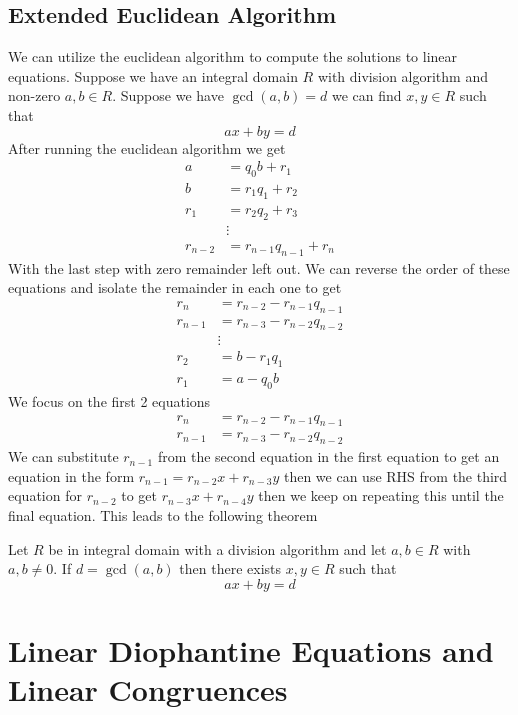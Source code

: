 \documentclass[16pt,a4paper]{article}
\theoremstyle{definition}
\begin{document}
\subsection{Extended Euclidean Algorithm}
We can utilize the euclidean algorithm to compute the solutions to linear equations. Suppose we have an integral domain $R$ with division algorithm and non-zero $a,b\in R$. Suppose we have $\gcd(a,b) = d$ we can find $x,y\in R$ such that 
\[ax+by=d\]
After running the euclidean algorithm we get  
\begin{align*}
a&=q_0b+r_1 \\
b &= r_1q_1 + r_2 \\
r_1 &= r_2q_2+r_3 \\
&\vdots \\
r_{n-2} &= r_{n-1}q_{n-1} + r_{n} 
\end{align*}
With the last step with zero remainder left out. 
\newpage
We can reverse the order of these equations and isolate the remainder in each one to get
\begin{align*}
r_n &= r_{n-2}-r_{n-1}q_{n-1} \\
r_{n-1} &= r_{n-3}-r_{n-2}q_{n-2} \\
&\vdots\\
r_2 &= b-r_1q_1 \\
r_1 &= a-q_0b
\end{align*}
We focus on the first 2 equations 
\begin{align*}
r_n &= r_{n-2}-r_{n-1}q_{n-1} \\
r_{n-1} &= r_{n-3}-r_{n-2}q_{n-2} 
\end{align*}
We can substitute $r_{n-1}$ from the second equation in the first equation to get an equation in the form $r_{n-1} = r_{n-2}x+r_{n-3}y$ then we can use RHS from the third equation for $r_{n-2}$ to get $r_{n-3}x+r_{n-4}y$ then we keep on repeating this until the final equation. This leads to the following theorem 
\begin{thm}{}{}\label{thm10}
Let $R$ be in integral domain with a division algorithm and let $a,b \in R$ with $a,b\neq 0$. If $d=\gcd(a,b)$ then there exists $x,y\in R$ such that 
\[ax+by = d\]  
\end{thm}
\newpage
\section{Linear Diophantine Equations and Linear Congruences}
\end{document}
